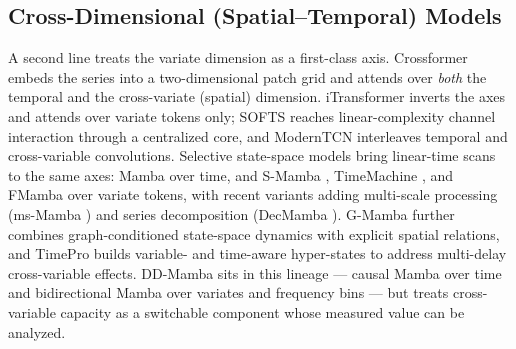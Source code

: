 \documentclass[review,12pt]{elsarticle}
\newcommand{\model}{DD-Mamba}
\begin{document}
\subsection{Cross-Dimensional (Spatial--Temporal) Models}
A second line treats the variate dimension as a first-class axis. Crossformer
\cite{crossformer} embeds the series into a two-dimensional patch grid and
attends over \emph{both} the temporal and the cross-variate (spatial)
dimension. iTransformer
\cite{itransformer} inverts the axes and attends over variate tokens only;
SOFTS \cite{softs} reaches linear-complexity channel interaction through a
centralized core, and ModernTCN \cite{moderntcn} interleaves temporal and
cross-variable convolutions. Selective state-space models bring linear-time
scans to the same axes: Mamba \cite{mamba,mamba2} over time, and S-Mamba
\cite{smamba}, TimeMachine \cite{timemachine}, and FMamba \cite{fmamba}
over variate tokens, with recent variants adding multi-scale processing
(ms-Mamba \cite{msmamba}) and series decomposition (DecMamba
\cite{decmamba}). G-Mamba \cite{gmamba} further combines
graph-conditioned state-space dynamics with explicit spatial relations, and
TimePro \cite{timepro} builds variable- and time-aware hyper-states to
address multi-delay cross-variable effects.
\model{} sits in this lineage --- causal Mamba over time and bidirectional
Mamba over variates and frequency bins --- but treats cross-variable
capacity as a switchable component whose measured value can be analyzed.
\end{document}
